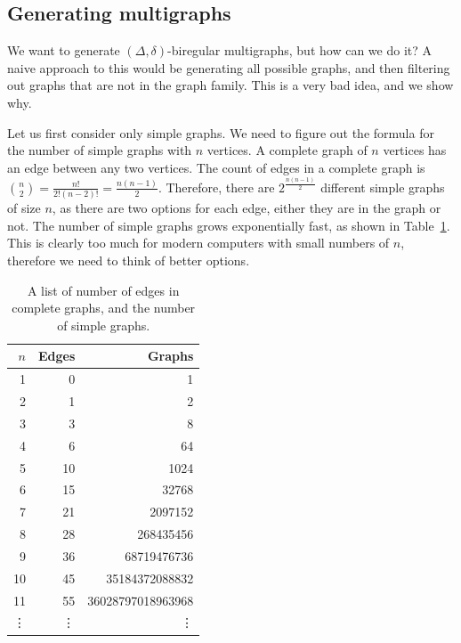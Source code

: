 


\subsection{Generating multigraphs}
We want to generate $(\Delta, \delta)$-biregular multigraphs, but how can we do it?
A naive approach to this would be generating all possible graphs, and then filtering out graphs that are not in the graph family.
This is a very bad idea, and we show why.

Let us first consider only simple graphs.
We need to figure out the formula for the number of simple graphs with $n$ vertices.
A complete graph of $n$ vertices has an edge between any two vertices.
The count of edges in a complete graph is \(\binom{n}{2} = \frac{n!}{2!(n-2)!} = \frac{n(n-1)}{2}.\)
Therefore, there are \(2^{\frac{n(n-1)}{2}}\) different simple graphs of size $n$, as there are two options for each edge, either they are in the graph or not.
The number of simple graphs grows exponentially fast, as shown in Table~\ref{tbl:graph_count_growth}.
This is clearly too much for modern computers with small numbers of $n$, therefore we need to think of better options.
\begin{table}[H]
  \centering
  \begin{tabular}{r|rr}
    \toprule
    $n$&Edges&Graphs\\
    \midrule
    1 & 0 &1\\
    2 & 1 &2\\
    3 & 3 &8\\
    4 & 6 &64\\
    5 & 10 &1024\\
    6 & 15 &32768\\
    7 & 21 &2097152\\
    8 & 28 &268435456\\
    9 & 36 &68719476736\\
    10 & 45 &35184372088832\\
    11 & 55 &36028797018963968\\
    \vdots & \vdots &\vdots\\
    \bottomrule
  \end{tabular}
  \caption{
    A list of number of edges in complete graphs, and the number of simple graphs.
  }
  \label{tbl:graph_count_growth}
\end{table}

